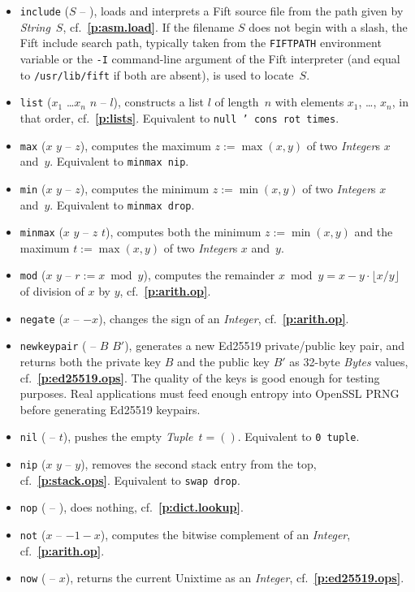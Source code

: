 \documentclass[12pt,oneside]{article}
\def\refpoint#1{{\rm\textbf{\ref{#1}}}}
\let\ptref=\refpoint
\begin{document}
\begin{itemize}
\item {\tt include} ($S$ -- ), loads and interprets a Fift source file from the path given by {\em String\/}~$S$, cf.~\ptref{p:asm.load}. If the filename $S$ does not begin with a slash, the Fift include search path, typically taken from the {\tt FIFTPATH} environment variable or the {\tt -I} command-line argument of the Fift interpreter (and equal to {\tt /usr/lib/fift} if both are absent), is used to locate~$S$.
\item {\tt list} ($x_1$ \dots $x_n$ $n$ -- $l$), constructs a list $l$ of length~$n$ with elements $x_1$, \ldots, $x_n$, in that order, cf.~\ptref{p:lists}. Equivalent to {\tt null ' cons rot times}.
\item {\tt max} ($x$ $y$ -- $z$), computes the maximum $z:=\max(x,y)$ of two {\em Integer\/}s $x$ and~$y$. Equivalent to {\tt minmax nip}.
\item {\tt min} ($x$ $y$ -- $z$), computes the minimum $z:=\min(x,y)$ of two {\em Integer\/}s $x$ and~$y$. Equivalent to {\tt minmax drop}.
\item {\tt minmax} ($x$ $y$ -- $z$ $t$), computes both the minimum $z:=\min(x,y)$ and the maximum $t:=\max(x,y)$ of two {\em Integer\/}s $x$ and~$y$.
\item {\tt mod} ($x$ $y$ -- $r:=x\bmod y$), computes the remainder $x\bmod y=x-y\cdot\lfloor x/y\rfloor$ of division of $x$ by $y$, cf.~\ptref{p:arith.op}.
\item {\tt negate} ($x$ -- $-x$), changes the sign of an {\em Integer}, cf.~\ptref{p:arith.op}.
\item {\tt newkeypair} ( -- $B$ $B'$), generates a new Ed25519 private/public key pair, and returns both the private key $B$ and the public key $B'$ as 32-byte {\em Bytes\/} values, cf.~\ptref{p:ed25519.ops}. The quality of the keys is good enough for testing purposes. Real applications must feed enough entropy into OpenSSL PRNG before generating Ed25519 keypairs.
\item {\tt nil} ( -- $t$), pushes the empty {\em Tuple\/}~$t=()$. Equivalent to {\tt 0 tuple}.
\item {\tt nip} ($x$ $y$ -- $y$), removes the second stack entry from the top, cf.~\ptref{p:stack.ops}. Equivalent to {\tt swap drop}.
\item {\tt nop} ( -- ), does nothing, cf.~\ptref{p:dict.lookup}.
\item {\tt not} ($x$ -- $-1-x$), computes the bitwise complement of an {\em Integer}, cf.~\ptref{p:arith.op}.
\item {\tt now} ( -- $x$), returns the current Unixtime as an {\em Integer}, cf.~\ptref{p:ed25519.ops}.

\end{itemize}
\end{document}
